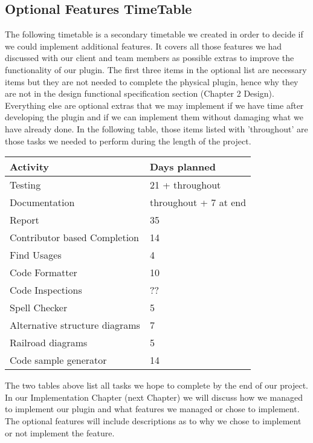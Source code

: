 \documentclass{l3proj}
\begin{document}
\subsection{Optional Features TimeTable}
The following timetable is a secondary timetable we created in order to decide if we could implement additional features. It covers all those features we had discussed with our client and team members as possible extras to improve the functionality of our plugin. The first three items in the optional list are necessary items but they are not needed to complete the physical plugin, hence why they are not in the design functional specification section (Chapter 2 Design). Everything else are optional extras that we may implement if we have time after developing the plugin and if we can implement them without damaging what we have already done. In the following table, those items listed with 'throughout' are those tasks we needed to perform during the length of the project.
\begin{center}
    \begin{tabular}{ | l | l |}
    \hline
    \textbf{Activity} & \textbf{Days planned}  \\ \hline
    Testing & 21 + throughout     \\ \hline
    Documentation & throughout + 7 at end   \\ \hline
    Report & 35  \\ \hline
    Contributor based Completion  & 14\\ \hline
    Find Usages & 4 \\ \hline
    Code Formatter & 10\\ \hline
    Code Inspections & ?? \\ \hline
    Spell Checker & 5\\ \hline
    Alternative structure diagrams & 7 \\ \hline
    Railroad diagrams & 5 \\ \hline
    Code sample generator & 14 \\ \hline
    \end{tabular}
\end{center}

The two tables above list all tasks we hope to complete by the end of our project. In our Implementation Chapter (next Chapter) we will discuss how we managed to implement our plugin and what features we managed or chose to implement. The optional features will include descriptions as to why we chose to implement or not implement the feature. 
\end{document}
